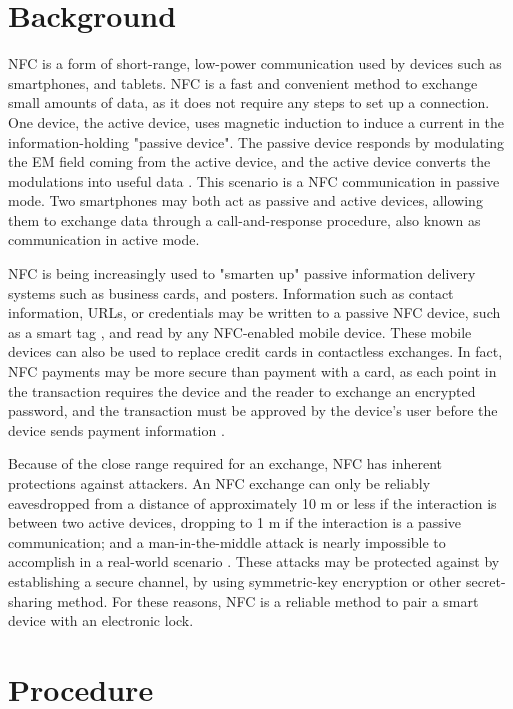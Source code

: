 \documentclass{article}
\begin{document}
\section{Background}

NFC is a form of short-range, low-power communication used by devices such as smartphones, and tablets. NFC is a fast and convenient method to exchange small amounts of data, as it does not require any steps to set up a connection. One device, the active device, uses magnetic induction to induce a current in the information-holding "passive device". The passive device responds by modulating the EM field coming from the active device, and the active device converts the modulations into useful data \autocite{NFCORG}. This scenario is a NFC communication in passive mode. Two smartphones may both act as passive and active devices, allowing them to exchange data through a call-and-response procedure, also known as communication in active mode.

NFC is being increasingly used to "smarten up" passive information delivery systems such as business cards, and posters. Information such as contact information, URLs, or credentials may be written to a passive NFC device, such as a smart tag \autocite{NFCFORUMWHATIS}, and read by any NFC-enabled mobile device. These mobile devices can also be used to replace credit cards in contactless exchanges. In fact, NFC payments may be more secure than payment with a card, as each point in the transaction requires the device and the reader to exchange an encrypted password, and the transaction must be approved by the device's user before the device sends payment information \autocite{NFCPAYMENT}.

Because of the close range required for an exchange, NFC has inherent protections against attackers. An NFC exchange can only be reliably eavesdropped from a distance of approximately 10 m or less if the interaction is between two active devices, dropping to 1 m if the interaction is a passive communication; and a man-in-the-middle attack is nearly impossible to accomplish in a real-world scenario \autocite{NFCSECURITY}. These attacks may be protected against by establishing a secure channel, by using symmetric-key encryption or other secret-sharing method. For these reasons, NFC is a reliable method to pair a smart device with an electronic lock.

\section{Procedure}
\end{document}
